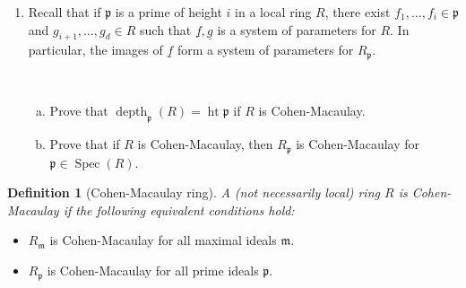 \documentclass[11pt]{book}
\newtheorem{definition}[theorem]{Definition}
\numberwithin{equation}{section}
\numberwithin{theorem}{chapter}
\theoremstyle{definition}
\newtheorem*{basic properties}{Basic Properties}
\newtheorem*{Important Remark}{Important Remark}
\theoremstyle{remark}
\newcommand{\m}{\mathfrak{m}}
\newcommand{\p}{\mathfrak{p}}
\newcommand{\Spec}{\operatorname{Spec}}
\newcommand{\height}{\operatorname{ht}}
\newcommand{\depth}{\operatorname{depth}}
\renewcommand{\height}{\operatorname{ht}}
\begin{document}
\begin{enumerate}
	\
	
	
	\item Recall that if $\p$ is a prime of height $i$ in a local ring $R$, there exist $f_1, \ldots, f_i \in \p$ and $g_{i+1}, \ldots, g_d \in R$ such that $\underline{f}, \underline{g}$ is a system of parameters for $R$. In particular, the images of $\underline{f}$ form a system of parameters for $R_{\p}$.
	
	\
	
	\begin{enumerate}[a)]
		\item Prove that $\depth_{\p}(R) = \height \p$ if $R$ is Cohen-Macaulay.
		
		
		
		\item Prove that if $R$ is Cohen-Macaulay, then $R_{\p}$ is Cohen-Macaulay for $\p \in \Spec(R)$.
		
		
	\end{enumerate} 
	
	
\end{enumerate}

\begin{definition}[Cohen-Macaulay ring]	A (not necessarily local) ring $R$ is Cohen-Macaulay if the following equivalent conditions hold:
\end{definition}
\begin{itemize}
	\item $R_\m$ is Cohen-Macaulay for all maximal ideals $\m$.
	\item $R_\p$ is Cohen-Macaulay for all prime ideals $\p$.
\end{itemize}

\
\end{document}
